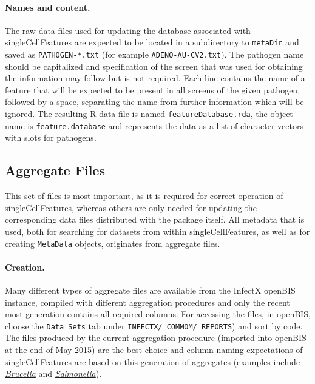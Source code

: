 \paragraph{Names and content.}
The raw data files used for updating the database associated with singleCellFeatures are expected to be located in a subdirectory to \texttt{metaDir} and saved as \texttt{PATHOGEN-*.txt} (for example \texttt{ADENO-AU-CV2.txt}). The pathogen name should be capitalized and specification of the screen that was used for obtaining the information may follow but is not required. Each line contains the name of a feature that will be expected to be present in all screens of the given pathogen, followed by a space, separating the name from further information which will be ignored. The resulting R data file is named \texttt{featureDatabase.rda}, the object name is \texttt{feature.database} and represents the data as a list of character vectors with slots for pathogens.

\subsection{Aggregate Files}
\label{sec:aggregate-files}
This set of files is most important, as it is required for correct operation of singleCellFeatures, whereas others are only needed for updating the corresponding data files distributed with the package itself. All metadata that is used, both for searching for datasets from within singleCellFeatures, as well as for creating \texttt{MetaData} objects, originates from aggregate files.

\paragraph{Creation.}
Many different types of aggregate files are available from the InfectX openBIS instance, compiled with different aggregation procedures and only the recent most generation contains all required columns. For accessing the files, in openBIS, choose the \texttt{Data Sets} tab under \texttt{INFECTX/_COMMOM/ REPORTS}) and sort by code. The files produced by the current aggregation procedure (imported into openBIS at the end of May 2015) are the best choice and column naming expectations of singleCellFeatures are based on this generation of aggregates (examples include \href{https://infectx.biozentrum.unibas.ch/openbis/index.html#entity=DATA_SET&permId=20150522094328451-3135287}{\textit{Brucella}} and \href{https://infectx.biozentrum.unibas.ch/openbis/index.html#entity=DATA_SET&permId=20150522100633413-3135295}{\textit{Salmonella}}).

